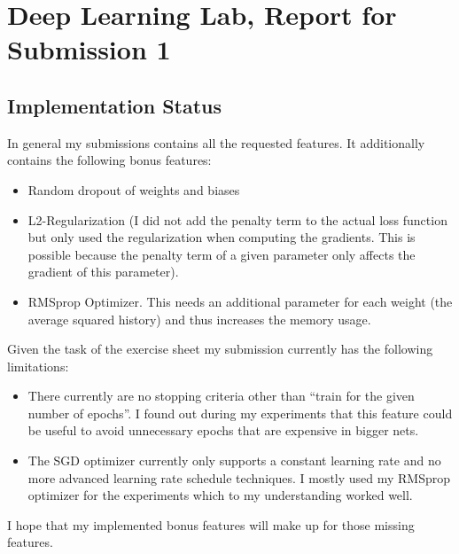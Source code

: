 \documentclass{scrartcl}
\begin{document}
\section*{Deep Learning Lab, Report for Submission 1}
\subsection*{Implementation Status}
In general my submissions contains all the requested features. It additionally contains the following bonus features:
\begin{itemize}
	\item Random dropout of weights and biases
	\item L2-Regularization (I did not add the penalty term to the actual loss function but only used the regularization when computing the gradients. This is possible because the penalty term of a given parameter only affects the gradient of this parameter).
	\item RMSprop Optimizer. This needs an additional parameter for each weight (the average squared history) and thus increases the memory usage.
\end{itemize}
Given the task of the exercise sheet my submission currently has the following limitations:
\begin{itemize}
	\item There currently are no stopping criteria other than \enquote{train for the given number of epochs}. I found out during my experiments that this feature could be useful to avoid unnecessary epochs that are expensive in bigger nets.
	\item The SGD optimizer currently only supports a constant learning rate and no more advanced learning rate schedule techniques. I mostly used my RMSprop optimizer for the experiments which to my understanding worked well.
\end{itemize}
I hope that my implemented bonus features will make up for those missing features.
\end{document}
